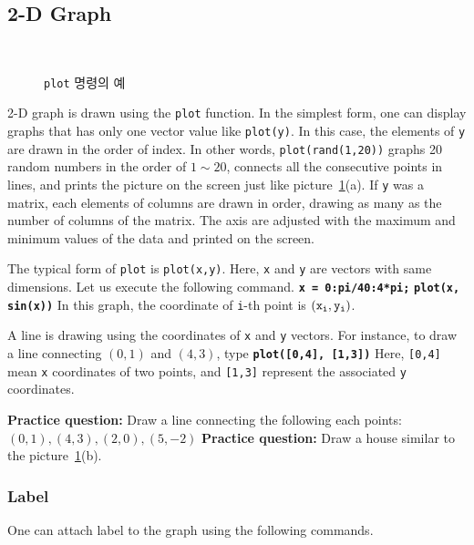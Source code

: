 \subsection{2-D Graph}

\begin{figure}
\centering
\mbox{%
 \quad
{}} \quad
\caption{{\tt plot} 명령의 예} \label{plot}
\end{figure}

2-D graph is drawn using the {\tt plot} function. In the simplest form, one can display graphs that has only one vector value like {\tt plot(y)}. In this case, the elements of {\tt y} are drawn in the order of index. In other words, {\tt plot(rand(1,20))} graphs 20 random numbers in the order of $1\sim20$, connects all the consecutive points in lines, and prints the picture on the screen just like picture~\ref{plot}(a). If {\tt y} was a matrix, each elements of columns are drawn in order, drawing as many as the number of columns of the matrix. The axis are adjusted with the maximum and minimum values of the data and printed on the screen.

\vv The typical form of {\tt plot} is {\tt plot(x,y)}. Here, {\tt x} and {\tt y} are vectors with same dimensions. Let us execute the following command. \matlabp\texttt{\textbf{x = 0:pi/40:4*pi;}} \matlabp\texttt{\textbf{plot(x, sin(x))}} \vn In this graph, the coordinate of {\tt i}-th point is $(\tt x_{i}, y_{i})$.

\vv A line is drawing using the coordinates of {\tt x} and {\tt y} vectors. For instance, to draw a line connecting $(0,1)$ and $(4,3)$, type \matlabp\texttt{\textbf{plot([0,4], [1,3])}} \vn Here, {\tt [0,4]} mean {\tt x} coordinates of two points, and {\tt [1,3]} represent  the associated {\tt y} coordinates.

\vn \textbf{Practice question:} Draw a line connecting the following each points: $(0,1), (4,3), (2,0), (5,-2)$ \vn \textbf{Practice question:} Draw a house similar to the picture~\ref{plot}(b).

\subsubsection{Label}
One can attach label to the graph using the following commands.

